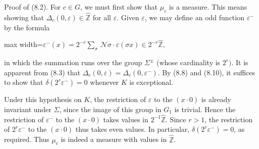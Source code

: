 \documentclass[11pt]{article}
\newcommand{\DFormula}[1]{\par\smallskip\noindent\begin{adjustbox}{max width=\linewidth}$\displaystyle #1$\end{adjustbox}\par\smallskip}
\begin{document}
\par
Proof of (8.2). For \(c\in G\), we must first show that \(\mu _{c}\) is a measure. This means showing that \(\Delta _{c}(0,\varepsilon )\in \widehat{\mathbb{Z}}\) for all \(\varepsilon \). Given \(\varepsilon \), we may define an odd function \(\varepsilon ^{-}\) by the formula\par
\par
\DFormula{\varepsilon ^{-}(x)=2^{-r}\sum _{\sigma }\,\mathcal{N}\sigma \cdot \varepsilon (\sigma x)\in 2^{-r}\widehat{\mathbb{Z}},}
\par
in which the summation runs over the group \(\Sigma ^{\pm }\) (whose cardinality is \(2^{r})\). It is apparent from (8.3) that \(\Delta _{c}(0,\varepsilon )=\Delta _{c}(0,\varepsilon ^{-})\). By (8.8) and (8.10), it suffices to show that \(\delta (2^{r}\varepsilon ^{-})=0\) whenever \(K\) is exceptional.\par
\par
Under this hypothesis on \(K\), the restriction of \(\varepsilon \) to the \((x\cdot 0)\) is already invariant under \(\Sigma \), since the image of this group in \(G_{1}\) is trivial. Hence the restriction of \(\varepsilon ^{-}\) to the \((x\cdot 0)\) takes values in \(2^{-1}\widehat{\mathbb{Z}}\). Since \(r>1\), the restriction of \(2^{r}\varepsilon ^{-}\) to the \((x\cdot 0)\) thus takes even values. In particular, \(\delta (2^{r}\varepsilon ^{-})=0\), as required. Thus \(\mu _{c}\) is indeed a measure with values in \(\widehat{\mathbb{Z}}\).\par
\par
\end{document}

